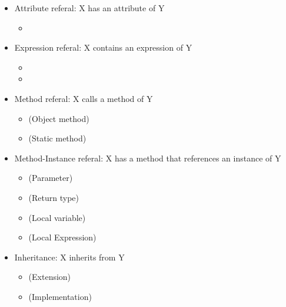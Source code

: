 \documentclass[
../../Software_Engineering_Summary.tex,
]
{subfiles}
\begin{document}
\begin{defbox}
    \begin{itemize}
        \item Attribute referal: X has an attribute of Y
        \begin{itemize}
            \item {}
        \end{itemize}
        \item Expression referal: X contains an expression of Y
        \begin{itemize}
            \item {}
            \item {}
        \end{itemize}
        \item Method referal: X calls a method of Y
        \begin{itemize}
            \item {} (Object method)
            \item {} (Static method) 
        \end{itemize}
        \item Method-Instance referal: X has a method that references an instance of Y
        \begin{itemize}
            \item {} (Parameter)
            \item {} (Return type)
            \item {} (Local variable)
            \item {} (Local Expression)
        \end{itemize}
        \item Inheritance: X inherits from Y
        \begin{itemize}
            \item {} (Extension)
            \item {} (Implementation)
        \end{itemize}
    \end{itemize}
\end{defbox}
\end{document}

